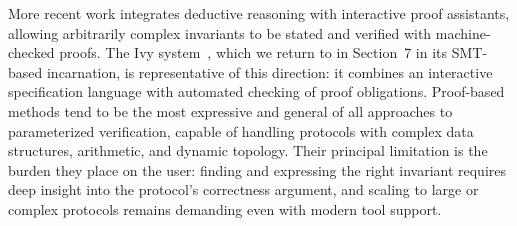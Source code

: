 More recent work integrates deductive reasoning with interactive proof
assistants, allowing arbitrarily complex invariants to be stated and verified
with machine-checked proofs. The Ivy system~\cite{PLSS16}, which we return to
in Section~7 in its SMT-based incarnation, is representative of this direction:
it combines an interactive specification language with automated checking of
proof obligations. Proof-based methods tend to be the most expressive and
general of all approaches to parameterized verification, capable of handling
protocols with complex data structures, arithmetic, and dynamic topology.
Their principal limitation is the burden they place on the user: finding and
expressing the right invariant requires deep insight into the protocol's
correctness argument, and scaling to large or complex protocols remains
demanding even with modern tool support.
